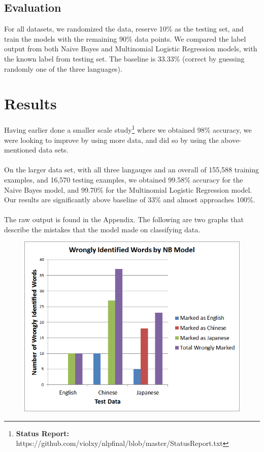 \documentclass[a4paper]{article}
\begin{document}
\subsection{Evaluation}
For all datasets, we randomized the data, reserve 10\% as the testing set, and train the models with the remaining 90\% data points. We compared the label output from both Naive Bayes and Multinomial Logistic Regression models, with the known label from testing set. The baseline is 33.33\% (correct by guessing randomly one of the three languages).
\section{Results}
Having earlier done a smaller scale study\footnote{\textbf{Status Report:} https://github.com/violxy/nlpfinal/blob/master/StatusReport.txt} where we obtained 98\% accuracy, we were looking to improve by using more data, and did so by using the above-mentioned data sets.\\
\\On the larger data set, with all three langauges and an overall of 155,588 training examples, and 16,570 testing examples, we obtained 99.58\% accuracy for the Naive Bayes model, and 99.70\% for the Multinomial Logistic Regression model. Our results are significantly above baseline of 33\% and almost approaches 100\%.\\
\\The raw output is found in the Appendix. The following are two graphs that describe the mistakes that the model made on classifying data.
\begin{figure}[H]
\centering
\includegraphics[width=\textwidth]{nbgraph.png}
\end{figure}
\end{document}
